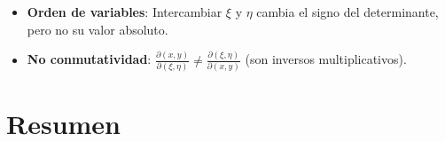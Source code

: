 \documentclass{article}
\begin{document}
\begin{minipage}{\dimexpr\textwidth-2\fboxsep}
\begin{itemize}
\item \textbf{Orden de variables}: Intercambiar $\xi$ y $\eta$ cambia el signo del determinante, pero no su valor absoluto.
\item \textbf{No conmutatividad}: $\frac{\partial(x,y)}{\partial(\xi,\eta)} \neq \frac{\partial(\xi,\eta)}{\partial(x,y)}$ (son inversos multiplicativos).
\end{itemize}
\end{minipage}

\section{Resumen}

\begin{center}
\end{center}
\end{document}
